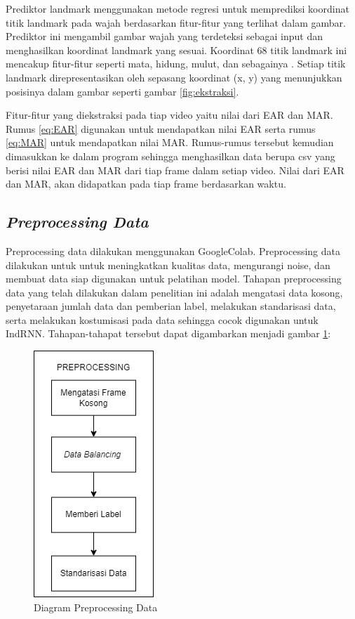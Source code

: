 Prediktor landmark menggunakan metode regresi untuk memprediksi koordinat titik landmark pada wajah berdasarkan fitur-fitur yang terlihat
dalam gambar. Prediktor ini mengambil gambar wajah yang terdeteksi sebagai input dan menghasilkan koordinat landmark yang sesuai.
Koordinat 68 titik landmark ini mencakup fitur-fitur seperti mata, hidung, mulut, dan sebagainya \parencite{13}. Setiap titik landmark
direpresentasikan oleh sepasang koordinat (x, y) yang menunjukkan posisinya dalam gambar seperti gambar \ref{fig:ekstraksi}.

Fitur-fitur yang diekstraksi pada tiap video yaitu nilai dari EAR dan MAR. Rumus \ref{eq:EAR} digunakan untuk mendapatkan
nilai EAR serta rumus \ref{eq:MAR} untuk mendapatkan nilai MAR. Rumus-rumus tersebut kemudian dimasukkan ke dalam program
sehingga menghasilkan data berupa csv yang berisi nilai EAR dan MAR dari tiap frame dalam setiap video. Nilai dari EAR dan MAR,
akan didapatkan pada tiap frame berdasarkan waktu.

\subsection{\emph{Preprocessing Data}}
Preprocessing data dilakukan menggunakan GoogleColab. Preprocessing data dilakukan untuk untuk meningkatkan kualitas data, mengurangi noise, dan membuat data siap digunakan untuk
pelatihan model. Tahapan preprocessing data yang telah dilakukan dalam penelitian ini adalah mengatasi data kosong, penyetaraan jumlah
data dan pemberian label, melakukan standarisasi data, serta melakukan kostumisasi pada data sehingga cocok digunakan untuk IndRNN.
Tahapan-tahapat tersebut dapat digambarkan menjadi gambar \ref{fig:preprocessing}:

\begin{figure} [ht] \centering
      \includegraphics[scale=0.8]{gambar/preprocessing.png}
      \caption{Diagram Preprocessing Data}
      \label{fig:preprocessing}
\end{figure}


